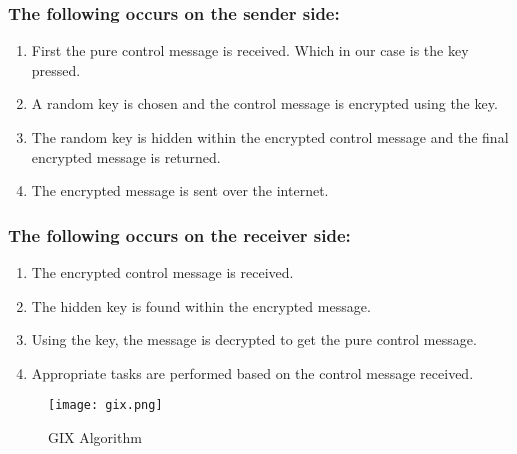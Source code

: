 \subsubsection*{The following occurs on the sender side: }
\begin{enumerate}
\item First the pure control message is received. Which in our case is the key pressed.
\item A random key is chosen and the control message is encrypted using the key.
\item The random key is hidden within the encrypted control message and the final encrypted message is returned.
\item The encrypted message is sent over the internet.
\end{enumerate}
\subsubsection*{The following occurs on the receiver side: }
\begin{enumerate}
\item The encrypted control message is received. 
\item The hidden key is found within the encrypted message.
\item Using the key, the message is decrypted to get the pure control message.
\item Appropriate tasks are performed based on the control message received. 
\end{enumerate}
\begin{figure}[h]
\centering
\texttt{[image: gix.png]}
\caption{GIX Algorithm}
\end{figure}
